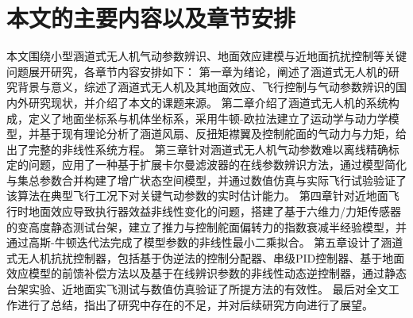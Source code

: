 



\section{本文的主要内容以及章节安排}
本文围绕小型涵道式无人机气动参数辨识、地面效应建模与近地面抗扰控制等关键问题展开研究，各章节内容安排如下：
第一章为绪论，阐述了涵道式无人机的研究背景与意义，综述了涵道式无人机及其地面效应、飞行控制与气动参数辨识的国内外研究现状，并介绍了本文的课题来源。
第二章介绍了涵道式无人机的系统构成，定义了地面坐标系与机体坐标系，采用牛顿-欧拉法建立了运动学与动力学模型，并基于现有理论分析了涵道风扇、反扭矩襟翼及控制舵面的气动力与力矩，给出了完整的非线性系统方程。
第三章针对涵道式无人机气动参数难以离线精确标定的问题，应用了一种基于扩展卡尔曼滤波器的在线参数辨识方法，通过模型简化与集总参数合并构建了增广状态空间模型，并通过数值仿真与实际飞行试验验证了该算法在典型飞行工况下对关键气动参数的实时估计能力。
第四章针对近地面飞行时地面效应导致执行器效益非线性变化的问题，搭建了基于六维力/力矩传感器的变高度静态测试台架，建立了推力与控制舵面偏转力的指数衰减半经验模型，并通过高斯-牛顿迭代法完成了模型参数的非线性最小二乘拟合。
第五章设计了涵道式无人机抗扰控制器，包括基于伪逆法的控制分配器、串级PID控制器、基于地面效应模型的前馈补偿方法以及基于在线辨识参数的非线性动态逆控制器，通过静态台架实验、近地面实飞测试与数值仿真验证了所提方法的有效性。
最后对全文工作进行了总结，指出了研究中存在的不足，并对后续研究方向进行了展望。

